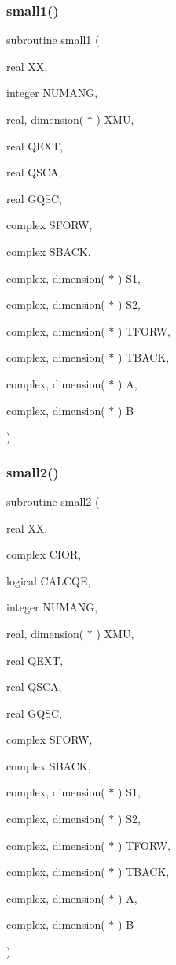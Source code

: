 \subsubsection{\texorpdfstring{small1()}{small1()}}
{\footnotesize\ttfamily subroutine small1 (\begin{DoxyParamCaption}\item[{real}]{XX,  }\item[{integer}]{N\+U\+M\+A\+NG,  }\item[{real, dimension( $\ast$ )}]{X\+MU,  }\item[{real}]{Q\+E\+XT,  }\item[{real}]{Q\+S\+CA,  }\item[{real}]{G\+Q\+SC,  }\item[{complex}]{S\+F\+O\+RW,  }\item[{complex}]{S\+B\+A\+CK,  }\item[{complex, dimension( $\ast$ )}]{S1,  }\item[{complex, dimension( $\ast$ )}]{S2,  }\item[{complex, dimension( $\ast$ )}]{T\+F\+O\+RW,  }\item[{complex, dimension( $\ast$ )}]{T\+B\+A\+CK,  }\item[{complex, dimension( $\ast$ )}]{A,  }\item[{complex, dimension( $\ast$ )}]{B }\end{DoxyParamCaption})}

\mbox{\label{miev0__py_8f_a4bae82b3142e7b49e6b14b735ea23988}} 
\subsubsection{\texorpdfstring{small2()}{small2()}}
{\footnotesize\ttfamily subroutine small2 (\begin{DoxyParamCaption}\item[{real}]{XX,  }\item[{complex}]{C\+I\+OR,  }\item[{logical}]{C\+A\+L\+C\+QE,  }\item[{integer}]{N\+U\+M\+A\+NG,  }\item[{real, dimension( $\ast$ )}]{X\+MU,  }\item[{real}]{Q\+E\+XT,  }\item[{real}]{Q\+S\+CA,  }\item[{real}]{G\+Q\+SC,  }\item[{complex}]{S\+F\+O\+RW,  }\item[{complex}]{S\+B\+A\+CK,  }\item[{complex, dimension( $\ast$ )}]{S1,  }\item[{complex, dimension( $\ast$ )}]{S2,  }\item[{complex, dimension( $\ast$ )}]{T\+F\+O\+RW,  }\item[{complex, dimension( $\ast$ )}]{T\+B\+A\+CK,  }\item[{complex, dimension( $\ast$ )}]{A,  }\item[{complex, dimension( $\ast$ )}]{B }\end{DoxyParamCaption})}

